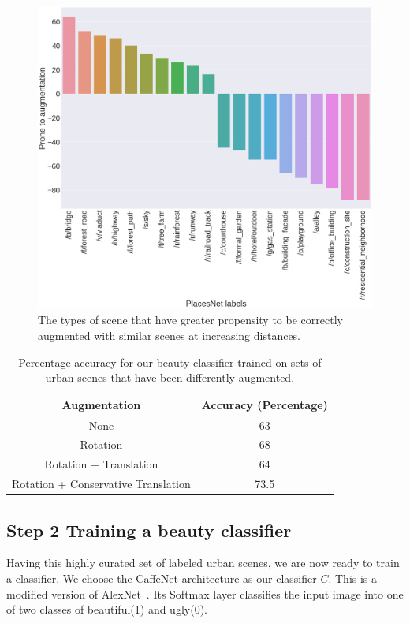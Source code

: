 \begin{figure}[t!]
	\centering
	\includegraphics[width=\columnwidth]{Plot/SimilarityPlacesPrevalence.png}
	\caption{The types of scene that have greater propensity to be correctly augmented with similar scenes at increasing distances.}
	\label{fig:augmentationSimilarity}
\end{figure}




\begin{table}[t!]
	\centering
	\begin{tabular}{|c|c|}
		\hline
		\textbf{Augmentation} & \textbf{Accuracy (Percentage)}\\
		\hline
		None & 63 \\
		\hline
		Rotation  & 68 \\
		\hline
		Rotation + Translation  & 64 \\
		\hline
		Rotation + Conservative Translation & 73.5 \\
		\hline
	\end{tabular}
	\caption{Percentage accuracy for our beauty classifier trained on sets of  urban scenes that have been differently augmented.}
	\label{tab:classifier}
    \vspace{-10mm}
\end{table}


\subsection*{Step 2 Training a beauty classifier}
\label{Sec:Classifier}
Having this highly curated set of labeled urban scenes, we are now ready to train a classifier. We choose the CaffeNet architecture as our classifier $C$. This is a modified version of AlexNet~\cite{krizhevsky2012imagenet,szegedy2015going}. Its Softmax layer  classifies the input image into one of two classes of beautiful(1) and ugly(0).  

